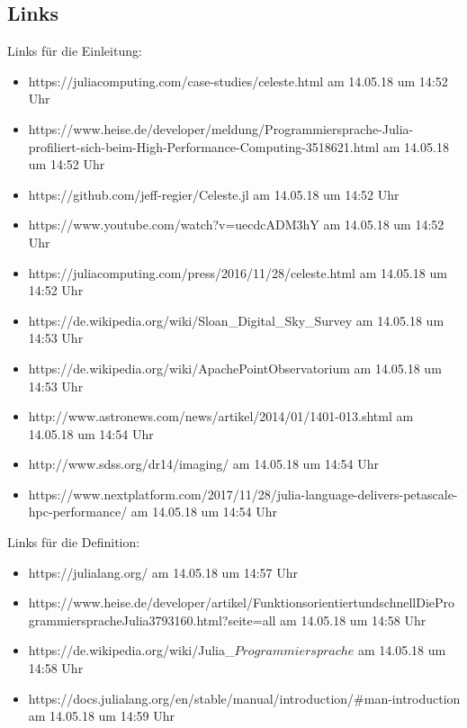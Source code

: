 \documentclass[proseminar,german,utf8]{zihpub}
\begin{document}
\subsection{Links}
Links für die Einleitung:
\begin{itemize}
\item https://juliacomputing.com/case-studies/celeste.html am 14.05.18 um 14:52 Uhr
\item https://www.heise.de/developer/meldung/Programmiersprache-Julia-profiliert-sich-beim-High-Performance-Computing-3518621.html am 14.05.18 um 14:52 Uhr
\item https://github.com/jeff-regier/Celeste.jl am 14.05.18 um 14:52 Uhr
\item https://www.youtube.com/watch?v=uecdcADM3hY am 14.05.18 um 14:52 Uhr
\item https://juliacomputing.com/press/2016/11/28/celeste.html am 14.05.18 um 14:52 Uhr
\item https://de.wikipedia.org/wiki/Sloan\_Digital\_Sky\_Survey am 14.05.18 um 14:53 Uhr
\item https://de.wikipedia.org/wiki/Apache\-Point\-Observatorium am 14.05.18 um 14:53 Uhr
\item http://www.astronews.com/news/artikel/2014/01/1401-013.shtml am 14.05.18 um 14:54 Uhr
\item http://www.sdss.org/dr14/imaging/ am 14.05.18 um 14:54 Uhr
\item https://www.nextplatform.com/2017/11/28/julia-language-delivers-petascale-hpc-performance/ am 14.05.18 um 14:54 Uhr
\end{itemize}

Links für die Definition:
\begin{itemize}
\item https://julialang.org/ am 14.05.18 um 14:57 Uhr
\item https://www.heise.de/developer/artikel/Funktionsorientiert\-und\-schnell\-Die\-Programmiersprache\-Julia\-3793160.html?seite=all am 14.05.18 um 14:58 Uhr
\item https://de.wikipedia.org/wiki/Julia\_\(Programmiersprache\) am 14.05.18 um 14:58 Uhr
\item https://docs.julialang.org/en/stable/manual/introduction/\#man-introduction am 14.05.18 um 14:59 Uhr
\end{itemize}
\end{document}
